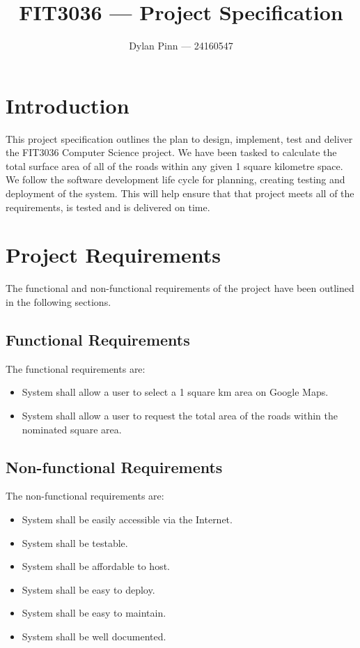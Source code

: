\documentclass[a4paper,11pt]{article}
\begin{document}
\title{FIT3036 --- Project Specification}
\author{Dylan Pinn --- 24160547}
\maketitle
\pagebreak

\tableofcontents
\pagebreak

\section{Introduction}

This project specification outlines the plan to design, implement, test and
deliver the FIT3036 Computer Science project. We have been tasked to calculate
the total surface area of all of the roads within any given 1 square kilometre
space. We follow the software development life cycle for planning, creating
testing and deployment of the system. This will help ensure that that project
meets all of the requirements, is tested and is delivered on time.

\section{Project Requirements}

The functional and non-functional requirements of the project have been outlined
in the following sections.

\subsection{Functional Requirements}

The functional requirements are:

\begin{itemize}
  \item System shall allow a user to select a 1 square km area on Google Maps.
  \item System shall allow a user to request the total area of the roads within
    the nominated square area.
\end{itemize}

\subsection{Non-functional Requirements}

The non-functional requirements are:

\begin{itemize}
  \item System shall be easily accessible via the Internet.
  \item System shall be testable.
  \item System shall be affordable to host.
  \item System shall be easy to deploy.
  \item System shall be easy to maintain.
  \item System shall be well documented.
\end{itemize}
\end{document}
